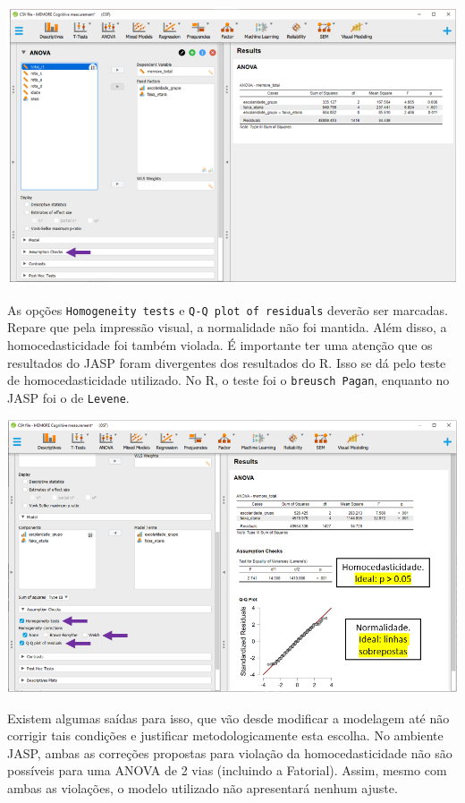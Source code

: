 \documentclass[
]{book}
\begin{document}
\includegraphics{./img/cap_anova_fatorial_pressupostos.png}

As opções \texttt{Homogeneity\ tests} e \texttt{Q-Q\ plot\ of\ residuals} deverão ser marcadas. Repare que pela impressão visual, a normalidade não foi mantida. Além disso, a homocedasticidade foi também violada. É importante ter uma atenção que os resultados do JASP foram divergentes dos resultados do R. Isso se dá pelo teste de homocedasticidade utilizado. No R, o teste foi o \texttt{breusch\ Pagan}, enquanto no JASP foi o de \texttt{Levene}.

\includegraphics{./img/cap_anova_two_way_pressupostos2.png}

Existem algumas saídas para isso, que vão desde modificar a modelagem até não corrigir tais condições e justificar metodologicamente esta escolha. No ambiente JASP, ambas as correções propostas para violação da homocedasticidade não são possíveis para uma ANOVA de 2 vias (incluindo a Fatorial). Assim, mesmo com ambas as violações, o modelo utilizado não apresentará nenhum ajuste.
\end{document}
